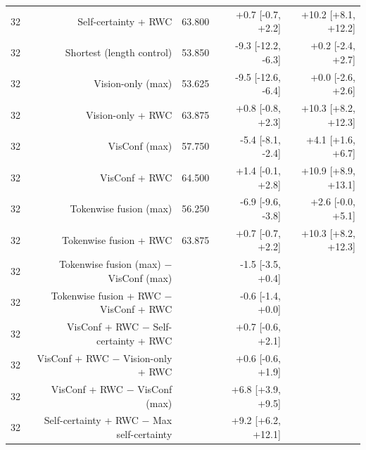 \begin{tabular}{lrrrr}
32 & Self-certainty + RWC & 63.800 & +0.7 [-0.7, +2.2] & +10.2 [+8.1, +12.2] \\
32 & Shortest (length control) & 53.850 & -9.3 [-12.2, -6.3] & +0.2 [-2.4, +2.7] \\
32 & Vision-only (max) & 53.625 & -9.5 [-12.6, -6.4] & +0.0 [-2.6, +2.6] \\
32 & Vision-only + RWC & 63.875 & +0.8 [-0.8, +2.3] & +10.3 [+8.2, +12.3] \\
32 & VisConf (max) & 57.750 & -5.4 [-8.1, -2.4] & +4.1 [+1.6, +6.7] \\
32 & VisConf + RWC & 64.500 & +1.4 [-0.1, +2.8] & +10.9 [+8.9, +13.1] \\
32 & Tokenwise fusion (max) & 56.250 & -6.9 [-9.6, -3.8] & +2.6 [-0.0, +5.1] \\
32 & Tokenwise fusion + RWC & 63.875 & +0.7 [-0.7, +2.2] & +10.3 [+8.2, +12.3] \\
32 & Tokenwise fusion (max) − VisConf (max) &  & -1.5 [-3.5, +0.4] &  \\
32 & Tokenwise fusion + RWC − VisConf + RWC &  & -0.6 [-1.4, +0.0] &  \\
32 & VisConf + RWC − Self-certainty + RWC &  & +0.7 [-0.6, +2.1] &  \\
32 & VisConf + RWC − Vision-only + RWC &  & +0.6 [-0.6, +1.9] &  \\
32 & VisConf + RWC − VisConf (max) &  & +6.8 [+3.9, +9.5] &  \\
32 & Self-certainty + RWC − Max self-certainty &  & +9.2 [+6.2, +12.1] &  \\
\bottomrule
\end{tabular}
